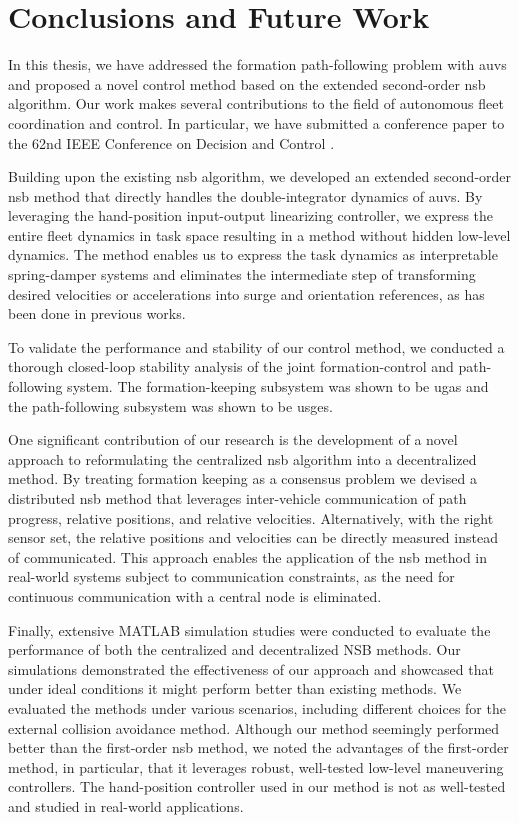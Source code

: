 \chapter{Conclusions and Future Work}\label{cha:conclusions}
%
In this thesis, we have addressed the formation path-following problem with \glspl{auv} and proposed a novel control method based on the extended second-order \gls{nsb} algorithm. Our work makes several contributions to the field of autonomous fleet coordination and control. In particular, we have submitted a conference paper to the 62nd IEEE Conference on Decision and Control \citep{lie_formation_2023}.

Building upon the existing \gls{nsb} algorithm, we developed an extended second-order \gls{nsb} method that directly handles the double-integrator dynamics of \glspl{auv}. By leveraging the hand-position input-output linearizing controller, we express the entire fleet dynamics in task space resulting in a method without hidden low-level dynamics. The method enables us to express the task dynamics as interpretable spring-damper systems and eliminates the intermediate step of transforming desired velocities or accelerations into surge and orientation references, as has been done in previous works.

To validate the performance and stability of our control method, we conducted a thorough closed-loop stability analysis of the joint formation-control and path-following system. The formation-keeping subsystem was shown to be \gls{ugas} and the path-following subsystem was shown to be \gls{usges}. 

One significant contribution of our research is the development of a novel approach to reformulating the centralized \gls{nsb} algorithm into a decentralized method. By treating formation keeping as a consensus problem we devised a distributed \gls{nsb} method that leverages inter-vehicle communication of path progress, relative positions, and relative velocities. Alternatively, with the right sensor set, the relative positions and velocities can be directly measured instead of communicated. This approach enables the application of the \gls{nsb} method in real-world systems subject to communication constraints, as the need for continuous communication with a central node is eliminated.

Finally, extensive MATLAB simulation studies were conducted to evaluate the performance of both the centralized and decentralized NSB methods. Our simulations demonstrated the effectiveness of our approach and showcased that under ideal conditions it might perform better than existing methods. We evaluated the methods under various scenarios, including different choices for the external collision avoidance method. Although our method seemingly performed better than the first-order \gls{nsb} method, we noted the advantages of the first-order method, in particular, that it leverages robust, well-tested low-level maneuvering controllers. The hand-position controller used in our method is not as well-tested and studied in real-world applications.

